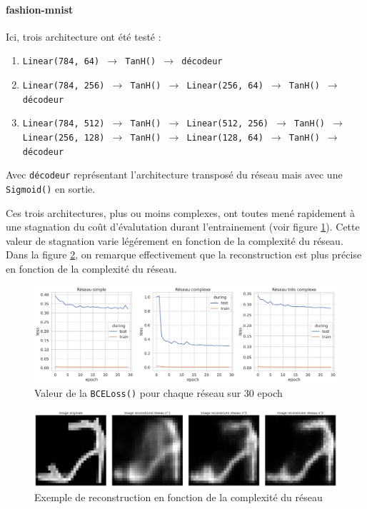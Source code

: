\documentclass{article}
\begin{document}
\paragraph*{fashion-mnist} 
Ici, trois architecture ont été testé : \begin{enumerate}
    \item \texttt{Linear(784, 64) $\rightarrow$ TanH() $\rightarrow$ décodeur}
    \item \texttt{Linear(784, 256) $\rightarrow$ TanH() $\rightarrow$ Linear(256, 64) $\rightarrow$ TanH() $\rightarrow$ décodeur}
    \item \texttt{Linear(784, 512) $\rightarrow$ TanH() $\rightarrow$ Linear(512, 256) $\rightarrow$ TanH() $\rightarrow$ Linear(256, 128) $\rightarrow$ TanH() $\rightarrow$ Linear(128, 64) $\rightarrow$ TanH() $\rightarrow$ décodeur}
\end{enumerate}
Avec \texttt{décodeur} représentant l'architecture transposé du réseau mais avec une \texttt{Sigmoid()} en sortie. 

Ces trois architectures, plus ou moins complexes, ont toutes mené rapidement à une stagnation du coût d'évalutation durant l'entrainement (voir figure \ref*{fig:lossencoder}). Cette valeur de stagnation varie légérement en fonction de la complexité du réseau. Dans la figure \ref*{fig:reconstruction}, on remarque effectivement que la reconstruction est plus précise en fonction de la complexité du réseau. 

\begin{figure}[htbp]
    \centering
    \includegraphics*[width=.75\textwidth]{loss_encoder_fashion_3_networks.pdf}
    \caption{Valeur de la \texttt{BCELoss()} pour chaque réseau sur 30 epoch}
    \label{fig:lossencoder}
\end{figure}

\begin{figure}[htbp]
    \centering
    \includegraphics*[width=.75\textwidth]{reconstruction_per_network_cplxity.pdf}
    \caption{Exemple de reconstruction en fonction de la complexité du réseau}
    \label{fig:reconstruction}
\end{figure}
\end{document}
